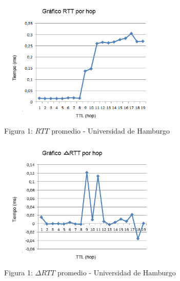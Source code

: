 \begin{figure}[h]
	\begin{center}
    \includegraphics[width=0.7\textwidth]{img_analisis3/grafico-rtt-promedio.jpg} 
    \caption{Figura 1: $RTT$ promedio - Universidad de Hamburgo}	
	\end{center} 
\end{figure}

\begin{figure}[h]
	\begin{center}
    \includegraphics[width=0.7\textwidth]{img_analisis3/grafico-delta-rtt-promedio.jpg} 
    \caption{Figura 1: $\Delta RTT$ promedio - Universidad de Hamburgo}	
	\end{center} 
\end{figure}
\newline
\newpage

